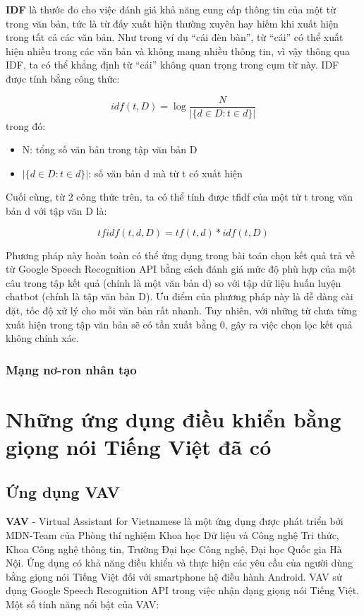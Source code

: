 \documentclass[12pt]{report}
\begin{document}
\textbf{IDF} là thước đo cho việc đánh giá khả năng cung cấp thông tin của một từ trong văn bản, tức là từ đấy xuất hiện thường xuyên hay hiếm khi xuất hiện trong tất cả các văn bản. Như trong ví dụ ``cái đèn bàn'', từ ``cái'' có thể xuất hiện nhiều trong các văn bản và không mang nhiều thông tin, vì vậy thông qua IDF, ta có thể khẳng định từ ``cái'' không quan trọng trong cụm từ này. IDF được tính bằng công thức:

\[idf(t, D) = \log\frac{N}{|\{d \in D: t \in d\}|}\]
trong đó:
\begin{itemize}
	\item N: tổng số văn bản trong tập văn bản D
	\item $|\{d \in D: t \in d\}|$: số văn bản d mà từ t có xuất hiện
\end{itemize}

Cuối cùng, từ 2 công thức trên, ta có thể tính được tfidf của một từ t trong văn bản d với tập văn D là:

\[tfidf(t, d, D) = tf(t, d) * idf(t, D)\]

Phương pháp này hoàn toàn có thể ứng dụng trong bài toán chọn kết quả trả về từ Google Speech Recognition API bằng cách đánh giá mức độ phù hợp của một câu trong tập kết quả (chính là một văn bản d) so với tập dữ liệu huấn luyện chatbot (chính là tập văn bản D). Ưu điểm của phương pháp này là dễ dàng cài đặt, tốc độ xử lý cho mỗi văn bản rất nhanh. Tuy nhiên, với những từ chưa từng xuất hiện trong tập văn bản sẽ có tần xuất bằng 0, gây ra việc chọn lọc kết quả không chính xác.

\subsubsection{Mạng nơ-ron nhân tạo}

\section{Những ứng dụng điều khiển bằng giọng nói Tiếng Việt đã có}

\subsection{Ứng dụng VAV}

\textbf{VAV} - Virtual Assistant for Vietnamese là một ứng dụng được phát triển bởi MDN-Team của Phòng thí nghiệm Khoa học Dữ liệu và Công nghệ Tri thức, Khoa Công nghệ thông tin, Trường Đại học Công nghệ, Đại học Quốc gia Hà Nội. Ứng dụng có khả năng điều khiển và thực hiện các yêu cầu của người dùng bằng giọng nói Tiếng Việt đối với smartphone hệ điều hành Android. VAV sử dụng Google Speech Recognition API trong việc nhận dạng giọng nói Tiếng Việt. Một số tính năng nổi bật của VAV:
\end{document}
